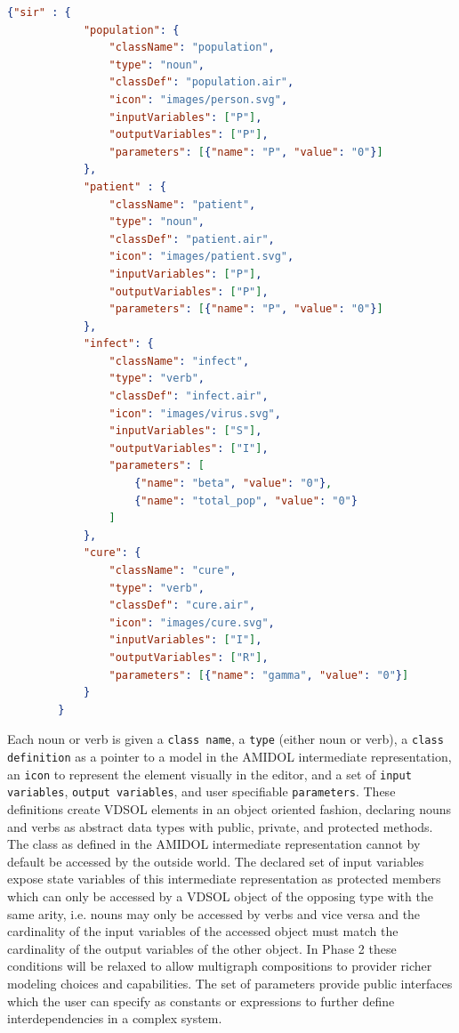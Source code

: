 \documentclass[11pt]{article}
\newcommand{\amidol}{\textsc{AMIDOL}}
\begin{document}
\begin{lstlisting}[language=json, caption=JSON Definition of SIR VDSOL Palette]
         {"sir" : {
            "population": {
                "className": "population",
                "type": "noun",
                "classDef": "population.air",
                "icon": "images/person.svg",
                "inputVariables": ["P"],
                "outputVariables": ["P"],
                "parameters": [{"name": "P", "value": "0"}]
            }, 
            "patient" : {
                "className": "patient",
                "type": "noun",
                "classDef": "patient.air",
                "icon": "images/patient.svg",
                "inputVariables": ["P"],
                "outputVariables": ["P"],
                "parameters": [{"name": "P", "value": "0"}]
            }, 
            "infect": {
                "className": "infect",
                "type": "verb",
                "classDef": "infect.air",
                "icon": "images/virus.svg",
                "inputVariables": ["S"],
                "outputVariables": ["I"],
                "parameters": [
                    {"name": "beta", "value": "0"},
                    {"name": "total_pop", "value": "0"}
                ]
            },
            "cure": {
                "className": "cure",
                "type": "verb",
                "classDef": "cure.air",
                "icon": "images/cure.svg",
                "inputVariables": ["I"],
                "outputVariables": ["R"],
                "parameters": [{"name": "gamma", "value": "0"}]
            }
        }
\end{lstlisting}

Each noun or verb is given a \texttt{class name}, a \texttt{type} (either noun or verb), a \texttt{class definition} as a pointer to a model in the \amidol{} intermediate representation, an \texttt{icon} to represent the element visually in the editor, and a set of \texttt{input variables}, \texttt{output variables}, and user specifiable \texttt{parameters}.  These definitions create VDSOL elements in an object oriented fashion, declaring nouns and verbs as abstract data types with public, private, and protected methods.  The class as defined in the \amidol{} intermediate representation cannot by default be accessed by the outside world.  The declared set of input variables expose state variables of this intermediate representation as protected members which can only be accessed by a VDSOL object of the opposing type with the same arity, i.e. nouns may only be accessed by verbs and vice versa and the cardinality of the input variables of the accessed object must match the cardinality of the output variables of the other object.  In Phase 2 these conditions will be relaxed to allow multigraph compositions to provider richer modeling choices and capabilities.  The set of parameters provide public interfaces which the user can specify as constants or expressions to further define interdependencies in a complex system.
\end{document}
